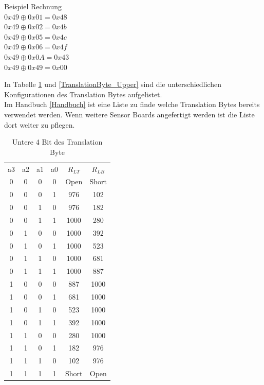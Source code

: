 Beispiel Rechnung\\
$0x49 \oplus 0x01 = 0x48$\\
$0x49 \oplus 0x02 = 0x4b$\\
$0x49 \oplus 0x05 = 0x4c$\\
$0x49 \oplus 0x06 = 0x4f$\\
$0x49 \oplus 0x0A = 0x43$\\
$0x49 \oplus 0x49 = 0x00$\\

\newpage

\noindent In Tabelle \ref{TranslationByte_Lower} und \ref{TranslationByte_Upper} sind die unterschiedlichen Konfigurationen des Translation Bytes aufgelistet.\\
Im Handbuch \ref{Handbuch} ist eine Liste zu finde welche Translation Bytes bereits verwendet werden. Wenn weitere Sensor Boards angefertigt werden ist die Liste dort weiter zu pflegen.

\begin{table}[!ht]
\caption{Untere 4 Bit des Translation Byte}
\label{TranslationByte_Lower}
\centering
\begin{tabular}{c|c|c|c|c|c}
 a3 & a2 & a1 & a0 & $R_{LT}$ & $R_{LB}$\\
 0 & 0 & 0 & 0 & Open & Short \\ 
 0 & 0 & 0 & 1 & 976 & 102\\ 
 0 & 0 & 1 & 0 & 976 & 182\\
 0 & 0 & 1 & 1 & 1000 & 280\\ 
 0 & 1 & 0 & 0 & 1000 & 392\\ 
 0 & 1 & 0 & 1 & 1000 & 523\\ 
 0 & 1 & 1 & 0 & 1000 & 681\\ 
 0 & 1 & 1 & 1 & 1000 & 887\\
 1 & 0 & 0 & 0 & 887 & 1000 \\ 
 1 & 0 & 0 & 1 & 681 & 1000\\ 
 1 & 0 & 1 & 0 & 523 & 1000\\
 1 & 0 & 1 & 1 & 392 & 1000\\ 
 1 & 1 & 0 & 0 & 280 & 1000\\ 
 1 & 1 & 0 & 1 & 182 & 976 \\ 
 1 & 1 & 1 & 0 & 102 & 976\\ 
 1 & 1 & 1 & 1 & Short & Open\\
\end{tabular}
\end{table}

